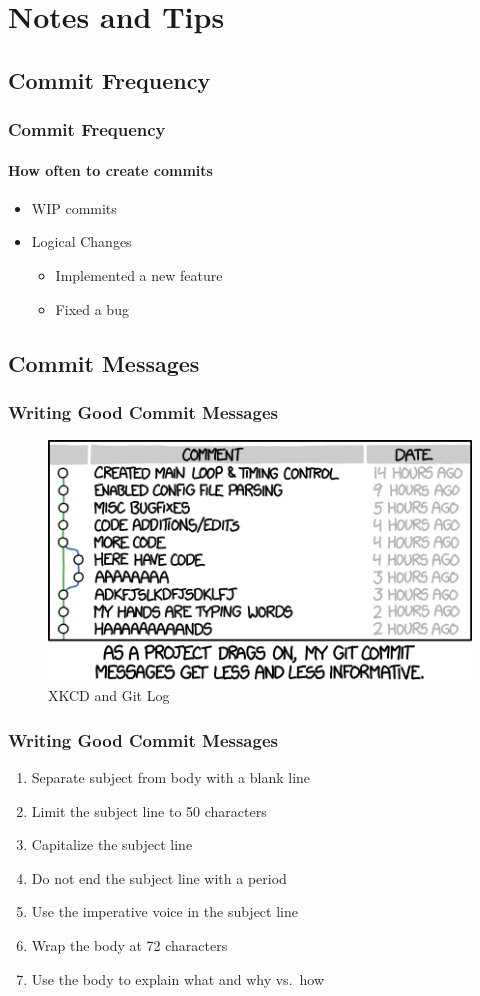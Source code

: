 \documentclass{beamer}
\begin{document}
\section{Notes and Tips}
\subsection{Commit Frequency}
\begin{frame}
\frametitle{Commit Frequency}
\framesubtitle{How often to create commits}
\begin{itemize}
\item{WIP commits}
\item{Logical Changes}
\begin{itemize}
\item{Implemented a new feature}
\item{Fixed a bug}
\end{itemize}
\end{itemize}
\end{frame}

\subsection{Commit Messages}
\begin{frame}
\frametitle{Writing Good Commit Messages}
\begin{figure}
\includegraphics[scale=0.45]{xkcd_git_commit.png}
\caption{XKCD and Git Log\cite{website:xkcd_revision_history_comic}}
\end{figure}
\end{frame}

\begin{frame}
\frametitle{Writing Good Commit Messages}
\begin{enumerate}
\item{Separate subject from body with a blank line}
\item{Limit the subject line to 50 characters}
\item{Capitalize the subject line}
\item{Do not end the subject line with a period}
\item{Use the imperative voice in the subject line}
\item{Wrap the body at 72 characters}
\item{Use the body to explain what and why vs.\ how}
\end{enumerate}
\end{frame}
\end{document}
